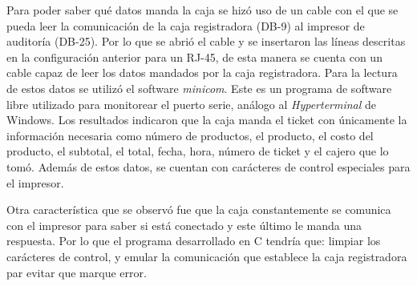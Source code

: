 \begin{center}
\end{center}

Para poder saber qué datos manda la caja se hizó uso de un cable con el que se pueda leer la comunicación de la caja registradora (DB-9) al impresor de auditoría (DB-25). Por lo que se abrió el cable y se insertaron las líneas descritas en la configuración anterior para un RJ-45, de esta manera se cuenta con un cable capaz de leer los datos mandados por la caja registradora. Para la lectura de estos datos se utilizó el software \textit{minicom}. Este es un programa de software libre utilizado para monitorear el puerto serie, análogo al \textit{Hyperterminal} de Windows. Los resultados indicaron que la caja manda el ticket con únicamente la información necesaria como número de productos, el producto, el costo del producto, el subtotal, el total, fecha, hora, número de ticket y el cajero que lo tomó. Además de estos datos, se cuentan con carácteres de control especiales para el impresor.

Otra característica que se observó fue que la caja constantemente se comunica con el impresor para saber si está conectado y este último le manda una respuesta. Por lo que el programa desarrollado en C tendría que: limpiar los carácteres de control, y emular la comunicación que establece la caja registradora par evitar que marque error.


